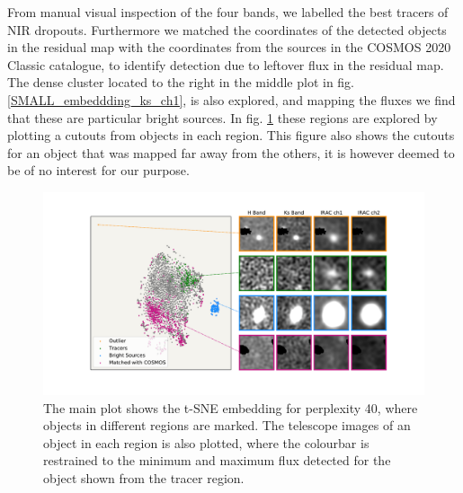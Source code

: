 From manual visual inspection of the four bands, we labelled the best tracers of NIR dropouts. Furthermore we matched the coordinates of the detected objects in the residual map with the coordinates from the sources in the COSMOS 2020 Classic catalogue, to identify detection due to leftover flux in the residual map. The dense cluster located to the right in the middle plot in fig. \ref{SMALL_embeddding_ks_ch1}, is also explored, and mapping the fluxes we find that these are particular bright sources. In fig. \ref{embedding_regions} these regions are explored by plotting a cutouts from objects in each region. This figure also shows the cutouts for an object that was mapped far away from the others, it is however deemed to be of no interest for our purpose.

\begin{figure}[]
    \centering %
    \includegraphics[trim={0cm 0cm 0cm 0cm},clip,width=\textwidth]{Code/Saved_Figures/Visual_inspection_embedding.pdf}
    \caption{The main plot shows the t-SNE embedding for perplexity 40, where objects in different regions are marked. The telescope images of an object in each region is also plotted, where the colourbar is restrained to the minimum and maximum flux detected for the object shown from the tracer region.}
    \label{embedding_regions}
\end{figure}

